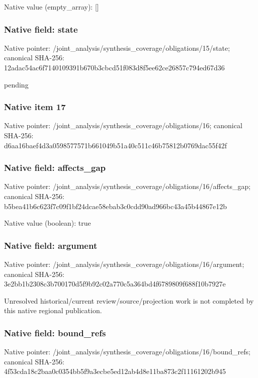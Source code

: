 \documentclass[10pt,a4paper]{article}
\begin{document}
Native value (empty\_\allowbreak{}array): []

\subsubsection{Native field: state}
Native pointer: /joint\_\allowbreak{}analysis/synthesis\_\allowbreak{}coverage/obligations/15/state; canonical SHA-256: 12adac54ac6f7140109391b670b3cbcd51f083d8f5ee62ce26857c794ed67d36

\begingroup\raggedright\sloppy pending\par\endgroup

\subsubsection{Native item 17}
Native pointer: /joint\_\allowbreak{}analysis/synthesis\_\allowbreak{}coverage/obligations/16; canonical SHA-256: d6aa16baef4d3a0598577571b661049b51a40c511c46b75812b0769dac55f42f

\subsubsection{Native field: affects\_\allowbreak{}gap}
Native pointer: /joint\_\allowbreak{}analysis/synthesis\_\allowbreak{}coverage/obligations/16/affects\_\allowbreak{}gap; canonical SHA-256: b5bea41b6c623f7c09f1bf24dcae58ebab3c0cdd90ad966bc43a45b44867e12b

Native value (boolean): true

\subsubsection{Native field: argument}
Native pointer: /joint\_\allowbreak{}analysis/synthesis\_\allowbreak{}coverage/obligations/16/argument; canonical SHA-256: 3e2bb1b2308c3b700170d5f9b92c02a770c5a364bd4f6789809f688f10b7927e

\begingroup\raggedright\sloppy Unresolved historical/\allowbreak{}current review/\allowbreak{}source/\allowbreak{}projection work is not completed by this native regional publication.\par\endgroup

\subsubsection{Native field: bound\_\allowbreak{}refs}
Native pointer: /joint\_\allowbreak{}analysis/synthesis\_\allowbreak{}coverage/obligations/16/bound\_\allowbreak{}refs; canonical SHA-256: 4f53cda18c2baa0c0354bb5f9a3ecbe5ed12ab4d8e11ba873c2f11161202b945
\end{document}
